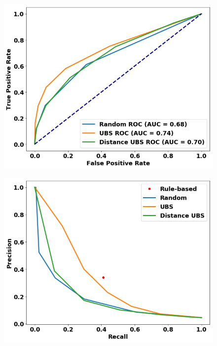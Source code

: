 \begin{figure}
\centering
\begin{minipage}[b]{.36\textwidth}
\includegraphics[trim=0in 0.1in 0.1in 0.in,clip,width=1.0\textwidth]{figures/rocs_lastround.png}
\captionsetup{labelformat=empty}
\label{fig:rocs_round5}
\end{minipage}\qquad
\hspace{2ex}
\begin{minipage}[b]{.36\textwidth}
\includegraphics[trim=0in 0.1in 0.1in 0.in,clip,width=1.0\textwidth]{figures/prcs_lastround.png}
\captionsetup{labelformat=empty}
\end{minipage}

\end{figure}
